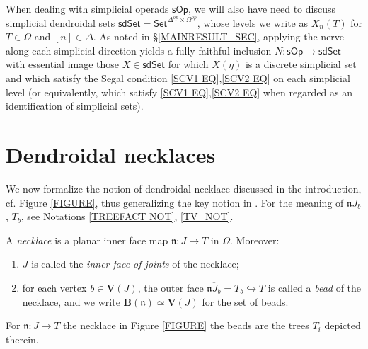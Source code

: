 \documentclass{hha}
\theoremstyle{definition} %
\newcommand{\sOp}{\mathsf{sOp}}
\begin{document}
\begin{remark}\label{SIMPOPREM}
	When dealing with simplicial operads $\sOp$,
	we will also have need to discuss
	simplicial dendroidal sets
	$\mathsf{sdSet} = \mathsf{Set}^{\Delta^{op} \times \Omega^{op}}$,
	whose levels we write as
	$X_n(T)$ for $T \in \Omega$ and $[n] \in \Delta$.
	As noted in \S \ref{MAINRESULT_SEC},
	applying the nerve along each simplicial direction
	yields a fully faithful inclusion
	$N \colon \sOp \to \mathsf{sdSet}$
	with essential image those $X \in \mathsf{sdSet}$
	for which $X(\eta)$ is a discrete simplicial set
	and which satisfy the Segal condition 
	\eqref{SCV1 EQ},\eqref{SCV2 EQ}
	on each simplicial level
	(or equivalently, which satisfy
	\eqref{SCV1 EQ},\eqref{SCV2 EQ}
	when regarded as an identification of simplicial sets).
\end{remark}




\section{Dendroidal necklaces}





We now formalize the notion of dendroidal necklace
discussed in the introduction,
cf. Figure \ref{FIGURE}, 
thus generalizing the key notion in \cite{DS11}.
For the meaning of 
$\overline{\mathfrak{n}J_b}$, $T_b$, see
Notations \ref{TREEFACT NOT}, \ref{TV_NOT}.


\begin{definition}[{cf. \cite[\S 3]{DS11}}]
        \label{NECKLACE_DEF}
	A \emph{necklace} is 
	a planar inner face map
	$\mathfrak{n} \colon J \to T$
	in $\Omega$.
	Moreover:
	\begin{enumerate}[label = (\roman*)]
		\item 
		$J$ is called the \emph{inner face of joints} of the necklace;
		\item for each vertex $b \in \boldsymbol{V}(J)$,
		the outer face
		$\overline{\mathfrak{n} J_b} = T_b \hookrightarrow T$
		is called a \emph{bead} of the necklace,
		and we write
		$\boldsymbol{B}(\mathfrak{n}) 
		\simeq 
		\boldsymbol{V}(J)$
		for the set of beads.
	\end{enumerate}
\end{definition}

\begin{example}
	For $\mathfrak{n} \colon J \to T$ the necklace 
	in Figure \ref{FIGURE} the beads 
	are the trees $T_i$ depicted therein.
\end{example}
\end{document}
